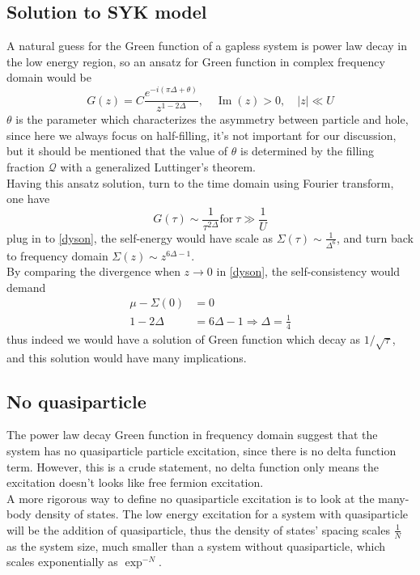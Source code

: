 \documentclass[10pt,openany]{book}
\theoremstyle{thmstyle} %
\theoremstyle{defstyle} %
\theoremstyle{prostyle} %
\begin{document}
\subsection{Solution to SYK model}

\indent A natural guess for the Green function of a gapless system is power law decay in the low energy region, so an ansatz for Green function in complex frequency domain would be
\begin{equation}
  G(z)=C \frac{e^{-i(\pi \Delta+\theta)}}{z^{1-2 \Delta}}, \quad \operatorname{Im}(z)>0, \quad|z| \ll U
  \label{ansatz}
\end{equation}
$ \theta $ is the parameter which characterizes the asymmetry between particle and hole, since here we always focus on half-filling, it's not important for our discussion, but it should be mentioned that the value of $ \theta $ is determined by the filling fraction $ \mathcal{Q} $ with a generalized Luttinger's theorem.\\
Having this ansatz solution, turn to the time domain using Fourier transform, one have
\begin{equation*}
  G(\tau)\sim \frac{1}{\tau^{2\Delta}} \text{for} \ \tau \gg \frac{1}{U}
\end{equation*}
plug in to \eqref{dyson}, the self-energy would have scale as $ \Sigma(\tau)\sim\frac{1}{\Delta^{6}} $, and turn back to frequency domain $\Sigma(z)\sim z^{6\Delta-1}$.\\
\indent By comparing the divergence when $ z\to 0 $ in \eqref{dyson}, the self-consistency would demand
\begin{equation}
  \begin{aligned}
    \mu-\Sigma(0) & =0 \\
    1-2 \Delta & =6 \Delta-1 \Rightarrow \Delta=\frac{1}{4}
    \end{aligned}
\end{equation}
thus indeed we would have a solution of Green function which decay as $ 1/\sqrt{\tau} $, and this solution would have many implications.
\subsection{No quasiparticle}
 The power law decay Green function in frequency domain suggest that the system has no quasiparticle particle excitation, since there is no delta function term. However, this is a crude statement, no delta function only means the excitation doesn't looks like free fermion excitation.\\
 \indent A more rigorous way to define no quasiparticle excitation is to look at the many-body density of states. The low energy excitation for a system with quasiparticle will be the addition of quasiparticle, thus the density of states' spacing scales $ \frac{1}{N} $ as the system size, much smaller than a system without quasiparticle, which scales exponentially as $ \exp^{-N} $.
\end{document}
